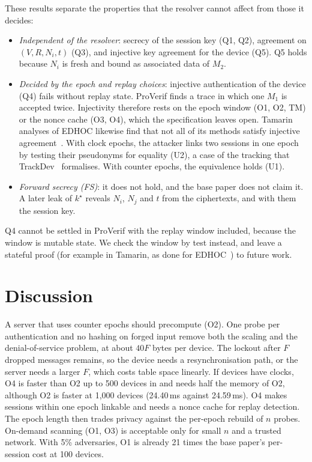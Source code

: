 These results separate the properties that the resolver cannot affect from those it decides:
\begin{itemize}
\item \emph{Independent of the resolver}: secrecy of the session key (Q1, Q2), agreement on $(V,R,N_i,t)$ (Q3), and
injective key agreement for the device (Q5). Q5 holds because $N_i$ is fresh and bound as associated data of $M_2$.
\item \emph{Decided by the epoch and replay choices}: injective authentication of the device (Q4) fails without replay
state. ProVerif finds a trace in which one $M_1$ is accepted twice. Injectivity therefore rests on the epoch window (O1,
O2, TM) or the nonce cache (O3, O4), which the specification leaves open. Tamarin analyses of EDHOC likewise find that not
all of its methods satisfy injective agreement~\cite{norrman21}. With clock epochs, the attacker links two sessions in one
epoch by testing their pseudonyms for equality (U2), a case of the tracking that TrackDev~\cite{budykho} formalises. With
counter epochs, the equivalence holds (U1).
\item \emph{Forward secrecy (FS)}: it does not hold, and the base paper does not claim it. A later leak of $k^\star$
reveals $N_i$, $N_j$ and $t$ from the ciphertexts, and with them the session key.
\end{itemize}

Q4 cannot be settled in ProVerif with the replay window included, because the window is mutable state. We check the
window by test instead, and leave a stateful proof (for example in Tamarin, as done for EDHOC~\cite{norrman23}) to future
work.
\fi

\section{Discussion}\label{sec:disc}
 A server that uses counter epochs should precompute (O2). One probe per
authentication and no hashing on forged input remove both the scaling and the denial-of-service problem, at about
$40F$ bytes per device. The lockout after $F$ dropped messages remains, so the device needs a resynchronisation path, or
the server needs a larger $F$, which costs table space linearly. If devices have clocks, O4 is faster than O2 up to 500
devices in  and needs half the memory of O2, although O2 is faster at 1{,}000 devices (24.40\,ms against
24.59\,ms). O4 makes sessions within one epoch linkable and needs a nonce cache for replay detection. The epoch length then
trades privacy against the per-epoch rebuild of $n$ probes. On-demand scanning (O1, O3) is acceptable only for small $n$
and a trusted network. With 5\% adversaries, O1 is already 21 times the base paper's per-session cost at 100 devices.

